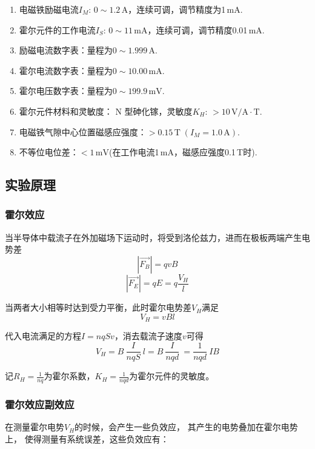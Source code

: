 \documentclass[11pt]{article}
\begin{document}
	\begin{enumerate}
		\item 电磁铁励磁电流$ I_M:\,0\sim1.2\,\mathrm A $，连续可调，调节精度为1\,mA.
		\item 霍尔元件的工作电流$ I_S:\,0\sim 11\,\mathrm{mA} $，连续可调，调节精度0.01\,mA.
		\item 励磁电流数字表：量程为$ 0\sim 1.999\,\mathrm A $.
		\item 霍尔电流数字表：量程为$ 0\sim 10.00\,\mathrm{mA} $.
		\item 霍尔电压数字表：量程为$ 0\sim 199.9\,\mathrm{mV} $.
		\item 霍尔元件材料和灵敏度： N 型砷化镓，灵敏度$ K_H:\,>10\,\mathrm{V/A\cdot T} $.
		\item 电磁铁气隙中心位置磁感应强度：$ >0.15\,\mathrm T\;(I_M=1.0\,\mathrm A) $.
		\item 不等位电位差：$ <1\,\mathrm{mV} $(在工作电流1\,mA，磁感应强度0.1\,T时).
	\end{enumerate}
	
	
	
	
	\subsection{实验原理}
	
	\subsubsection{霍尔效应}
	当半导体中载流子在外加磁场下运动时，将受到洛伦兹力，进而在极板两端产生电势差
	\[|\vec{F_B}|=qvB\]
	\[|\vec{F_E}|=qE=q\frac{V_H}{l}\]
	
	当两者大小相等时达到受力平衡，此时霍尔电势差$V_H$满足
	\[V_H=vBl\]
	
	代入电流满足的方程$I=nqSv$，消去载流子速度$v$可得
	\[V_H=B\ \frac{I}{nqS}\ l=B\ \frac{I}{nqd}\ = \frac{1}{nqd}\ IB\]
	
	记$R_H=\frac{1}{nq}$为霍尔系数，$K_H=\frac{1}{nqd}$为霍尔元件的灵敏度。
	
	\subsubsection{霍尔效应副效应}
	
	在测量霍尔电势$V_H$的时候，会产生一些负效应，
	其产生的电势叠加在霍尔电势上，
	使得测量有系统误差，这些负效应有：
	
\end{document}
